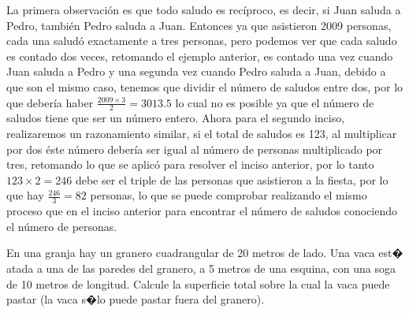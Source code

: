 \begin{Solucion}
  La primera observaci\'on es que todo saludo es rec\'iproco, es decir, si Juan saluda a Pedro, tambi\'en
Pedro saluda a Juan. Entonces ya que asistieron 2009 personas, cada una salud\'o exactamente a tres personas,
pero podemos ver que cada saludo es contado dos veces, retomando el ejemplo anterior, es contado una vez cuando Juan
saluda a Pedro y una segunda vez cuando Pedro saluda a Juan, debido a que son el mismo caso, tenemos que dividir el
n\'umero de saludos entre dos, por lo que deber\'ia haber $\tfrac{2009\times 3}{2}=3013.5$ lo cual no es posible ya
que el n\'umero de saludos tiene que ser un n\'umero entero.
Ahora para el segundo inciso, realizaremos un razonamiento similar, si el total de saludos es 123, al multiplicar por
dos \'este n\'umero deber\'ia ser igual al n\'umero de personas multiplicado por tres, retomando lo que se aplic\'o para
resolver el inciso anterior, por lo tanto $123\times 2=246$ debe ser el triple de las personas que asistieron a la
fiesta, por lo que hay $\tfrac{246}{3}=82$ personas, lo que se puede comprobar realizando el mismo proceso que en el
inciso anterior para encontrar el n\'umero de saludos conociendo el n\'umero de personas.
\end{Solucion}

\begin{Problema}{6}
  En una granja hay un granero cuadrangular de 20 metros de lado. Una
  vaca est� atada a una de las paredes del granero, a 5 metros de una
  esquina, con una soga de 10 metros de longitud.  Calcule la
  superficie total sobre la cual la vaca puede pastar (la vaca s�lo
  puede pastar fuera del granero).
\end{Problema}

\begin{Solucion}
  
\end{Solucion}

